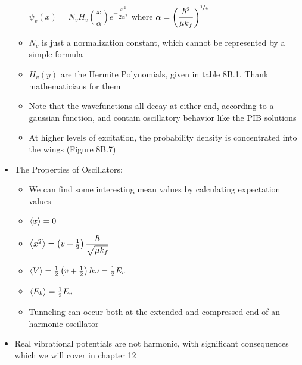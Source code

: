\documentclass[12pt, openany, letterpaper]{memoir}
\begin{document}
\begin{itemize}
\begin{itemize}
		$\psi_v(x) = N_vH_v\left(\dfrac{x}{\alpha}\right)e^{-\dfrac{x^2}{2\alpha^2}}$ where $\alpha = \left(\dfrac{\hbar^2}{\mu k_f}\right)^{\nicefrac{1}{4}}$
		\item $N_v$ is just a normalization constant, which cannot be represented by a simple formula
		\item $H_v(y)$ are the Hermite Polynomials, given in table 8B.1. Thank mathematicians for them
		\item Note that the wavefunctions all decay at either end, according to a gaussian function, and contain oscillatory behavior like the PIB solutions
		\item At higher levels of excitation, the probability density is concentrated into the wings (Figure 8B.7)
	\end{itemize}
	\item The Properties of Oscillators:
	\begin{itemize}
		\item We can find some interesting mean values by calculating expectation values
		\item $\left< x \right>=0$
		\item $\left< x^2 \right>=\left(v+\frac{1}{2}\right)\dfrac{\hbar}{\sqrt{\mu k_f}}$
		\item $\left< V \right>=\frac{1}{2}\left(v+\frac{1}{2}\right)\hbar\omega=\frac{1}{2}E_v$
		\item $\left< E_k \right>=\frac{1}{2}E_v$
		\item Tunneling can occur both at the extended and compressed end of an harmonic oscillator
	\end{itemize}
	\item Real vibrational potentials are not harmonic, with significant consequences which we will cover in chapter 12
\end{itemize}
\end{document}
